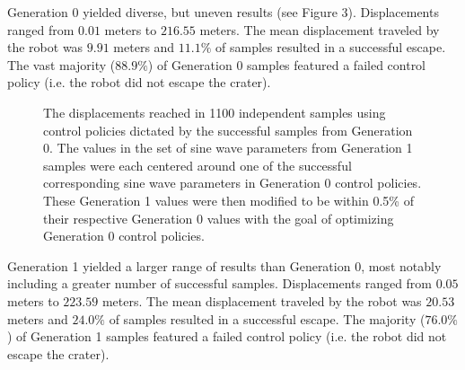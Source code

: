 \documentclass{llncs}
\begin{document}
{{%
Generation 0 yielded diverse, but uneven results (see Figure $3$).
Displacements ranged from $0.01$ meters to $216.55$ meters.
The mean displacement traveled by the robot was $9.91$ meters and $11.1\%$ of samples resulted in a successful escape.
The vast majority ($88.9\%$) of Generation 0 samples featured a failed control policy (i.e. the robot did not escape the crater).
} 

\label{resultsgen1} {
\begin{figure}
\label{gen1scatter}
\centering
{} 
\caption{The displacements reached in 1100 independent samples using control policies dictated by the successful samples from Generation 0. 
The values in the set of sine wave parameters from Generation 1 samples were each centered around one of the successful corresponding sine wave parameters in Generation 0 control policies.
These Generation 1 values were then modified to be within 0.5\% of their respective Generation 0 values with the goal of optimizing Generation 0 control policies.}
\end{figure}

Generation 1 yielded a larger range of results than Generation 0, most notably including a greater number of successful samples.
Displacements ranged from $0.05$ meters to $223.59$ meters.
The mean displacement traveled by the robot was $20.53$ meters and $24.0\%$ of samples resulted in a successful escape.
The majority ($76.0\%$) of Generation 1 samples featured a failed control policy (i.e. the robot did not escape the crater).
}

}
\end{document}
